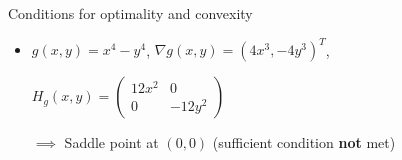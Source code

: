 \documentclass[11pt,compress,t,notes=noshow, xcolor=table]{beamer}
\begin{document}
\begin{vbframe}{Conditions for optimality and convexity}
\begin{itemize}
    \vspace{\baselineskip}
        
    \item $g(x,y) = x^4 - y^4$, $\nabla g(x,y) = (4x^3,-4y^3)^T$,
    
        $H_g(x,y) = \begin{pmatrix}12x^2 & 0 \\ 0 & -12y^2\end{pmatrix}$

        $\implies$ Saddle point at $(0,0)$ (sufficient condition \textbf{not} met)
\end{itemize}

\end{vbframe}

\endlecture
\end{document}
